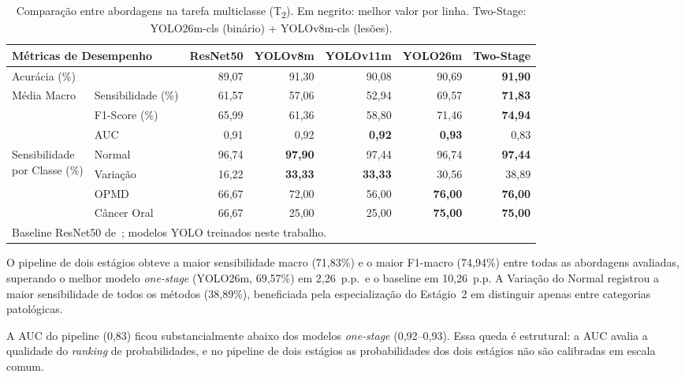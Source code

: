 \documentclass[12pt]{article}
\begin{document}
\begin{table}[htbp]
  \centering
  \caption{Comparação entre abordagens na tarefa multiclasse (T\textsubscript{2}).
           Em negrito: melhor valor por linha.
           Two-Stage: YOLO26m-cls (binário) + YOLOv8m-cls (lesões).}
  \label{tab:twostage}
  \footnotesize
  \begin{tabular}{llrrrrr}
    \toprule
    \multicolumn{2}{l}{Métricas de Desempenho}
      & ResNet50 & YOLOv8m & YOLOv11m & YOLO26m & Two-Stage \\
    \midrule
    \multicolumn{2}{l}{Acurácia (\%)}
      & 89,07 & 91,30 & 90,08 & 90,69 & \textbf{91,90} \\
    \midrule
    \multirow{3}{*}{Média Macro}
      & Sensibilidade (\%)  & 61,57 & 57,06 & 52,94 & 69,57 & \textbf{71,83} \\
      & F1-Score (\%)       & 65,99 & 61,36 & 58,80 & 71,46 & \textbf{74,94} \\
      & AUC                 & 0,91  & 0,92  & \textbf{0,92}  & \textbf{0,93}  & 0,83  \\
    \midrule
    \multirow{4}{*}{\parbox{1.8cm}{Sensibilidade\\por Classe (\%)}}
      & Normal      & 96,74 & \textbf{97,90} & 97,44 & 96,74 & \textbf{97,44} \\
      & Variação    & 16,22 & \textbf{33,33} & \textbf{33,33} & 30,56 & 38,89 \\
      & OPMD        & 66,67 & 72,00 & 56,00 & \textbf{76,00} & \textbf{76,00} \\
      & Câncer Oral & 66,67 & 25,00 & 25,00 & \textbf{75,00} & \textbf{75,00} \\
    \bottomrule
    \multicolumn{7}{l}{\footnotesize{Baseline ResNet50 de~\cite{smartom}; modelos YOLO treinados neste trabalho.}}
  \end{tabular}
\end{table}

O pipeline de dois estágios obteve a maior sensibilidade macro (71,83\%)
e o maior F1-macro (74,94\%) entre todas as abordagens avaliadas,
superando o melhor modelo \textit{one-stage} (YOLO26m, 69,57\%) em
2,26~p.p.\ e o baseline em 10,26~p.p.
A Variação do Normal registrou a maior sensibilidade de todos os métodos
(38,89\%), beneficiada pela especialização do Estágio~2 em distinguir
apenas entre categorias patológicas.

A AUC do pipeline (0,83) ficou substancialmente abaixo dos modelos
\textit{one-stage} (0,92--0,93).
Essa queda é estrutural: a AUC avalia a qualidade do \textit{ranking}
de probabilidades, e no pipeline de dois estágios as probabilidades dos
dois estágios não são calibradas em escala comum.
\end{document}
